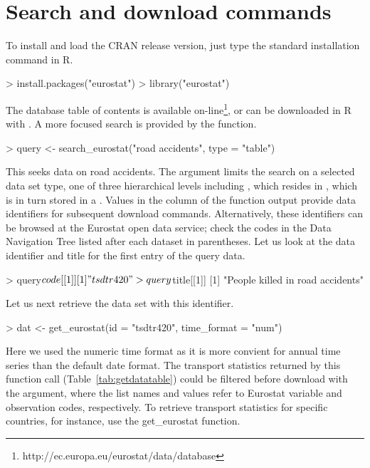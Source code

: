 \section{Search and download commands}

To install and load the CRAN release version, just type the standard installation command in R.

\begin{example}
> install.packages("eurostat")
> library("eurostat")
\end{example}


The database table of contents is available
on-line\footnote{http://ec.europa.eu/eurostat/data/database}, or can
be downloaded in R with . A more focused
search is provided by the  function.

\begin{example}
> query <- search_eurostat("road accidents", type = "table")
\end{example}

This seeks data on road accidents. The  argument limits the
search on a selected data set type, one of three hierarchical levels
including , which resides in , which is in turn stored in a . Values in the  column of the  function output provide data identifiers for subsequent download commands. Alternatively, these identifiers can be browsed at the Eurostat open data service; check the codes in the Data Navigation Tree listed after each dataset in parentheses. Let us look at the data identifier and title for the first entry of the query data.

\begin{example}
> query$code[[1]]
[1] "tsdtr420"

> query$title[[1]]
[1] "People killed in road accidents"
\end{example}


Let us next retrieve the data set with this identifier.

\begin{example}
> dat <- get_eurostat(id = "tsdtr420", time_format = "num")
\end{example}

Here we used the numeric time format as it is more convient for annual
time series than the default date format. The transport statistics
returned by this function call (Table~\ref{tab:getdatatable}) could be
filtered before download with the  argument, where the
list names and values refer to Eurostat variable and observation
codes, respectively. To retrieve transport statistics for specific
countries, for instance, use the get\_eurostat function.

